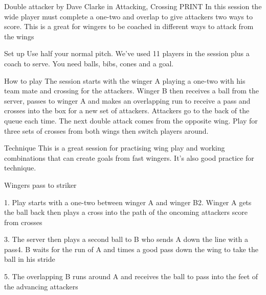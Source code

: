Double attacker
by Dave Clarke in Attacking, Crossing
PRINT 
In this session the wide player must complete a one-two and overlap to give attackers two ways to score. This is a great for wingers to be coached in different ways to attack from the wings

Set up
Use half your normal pitch. We’ve used 11 players in the session plus a coach to serve. You need balls, bibs, cones and a goal.

How to play
The session starts with the winger A playing a one-two with his team mate and crossing for the attackers. Winger B then receives a ball from the server, passes to winger A and makes an overlapping run to receive a pass and crosses into the box for a new set of attackers. Attackers go to the back of the queue each time. The next double attack comes from the opposite wing. Play for three sets of crosses from both wings then switch players around.

Technique
This is a great session for practising wing play and working combinations that can create goals from fast wingers. It’s also good practice for technique.

Wingers pass to striker

1. Play starts with a one-two between winger A and winger B2. Winger A gets the ball back then plays a cross into the path of the oncoming attackers
score from crosses

3. The server then plays a second ball to B who sends A down the line with a pass4. B waits for the run of A and times a good pass down the wing to take the ball in his stride


5. The overlapping B runs around A and receives the ball to pass into the feet of the advancing attackers